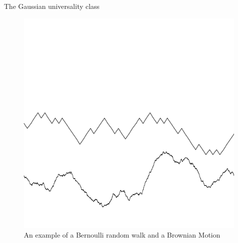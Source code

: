 \documentclass[9pt,t,dvipsnames]{beamer}
\begin{document}
\begin{frame}{The Gaussian universality class}
\begin{figure}
\includegraphics[height=0.5\textheight]{graphics/Gaussian.png}
\caption{An example of a Bernoulli random walk and a Brownian Motion}
\end{figure}

\end{frame}
\end{document}
